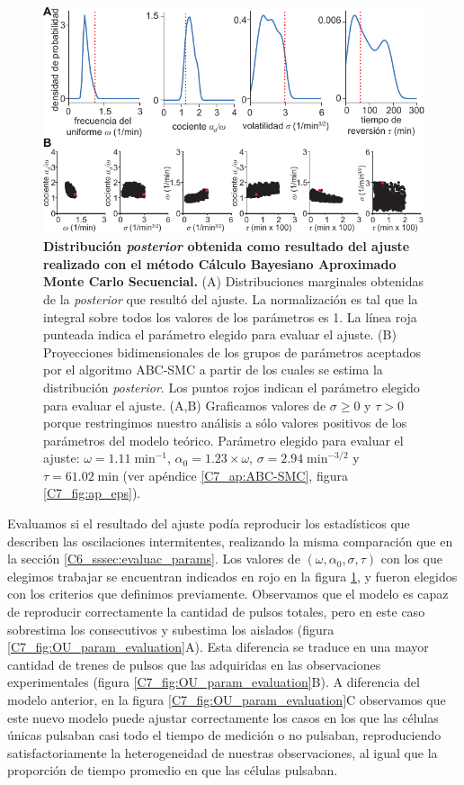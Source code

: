 \documentclass[./main.tex]{subfiles}
\begin{document}
\begin{figure}
    \centering
    \includegraphics[width=1\columnwidth]{figures/chapter7/C7_OU_fit.pdf} 
    \caption{\textbf{Distribución \textit{posterior} obtenida como resultado del ajuste realizado con el método Cálculo Bayesiano Aproximado Monte Carlo Secuencial.} (A) Distribuciones marginales obtenidas de la \textit{posterior} que resultó del ajuste. La normalización es tal que la integral sobre todos los valores de los parámetros es 1. La línea roja punteada indica el parámetro elegido para evaluar el ajuste. (B) Proyecciones bidimensionales de los grupos de parámetros aceptados por el algoritmo ABC-SMC a partir de los cuales se estima la distribución \textit{posterior}. Los puntos rojos indican el parámetro elegido para evaluar el ajuste. (A,B) Graficamos valores de $\sigma \geq 0$ y $\tau > 0$ porque restringimos nuestro análisis a sólo valores positivos de los parámetros del modelo teórico. Parámetro elegido para evaluar el ajuste: $\omega = 1.11\; \text{min}^{-1}$, $\alpha_0 = 1.23 \times \omega$, $ \sigma = 2.94 \;  \text{min}^{-3/2}$ y $\tau = 61.02 \; \text{min} $ (ver apéndice \ref{C7_ap:ABC-SMC}, figura \ref{C7_fig:ap_eps}).}
    \label{C7_fig:OU_fit}
\end{figure} 


Evaluamos si el resultado del ajuste podía reproducir los estadísticos que describen las oscilaciones intermitentes, realizando la misma comparación que en la sección \ref{C6_sssec:evaluac_params}. Los valores de $(\omega,\alpha_0,\sigma,\tau)$ con los que elegimos trabajar se encuentran indicados en rojo en la figura \ref{C7_fig:OU_fit}, y fueron elegidos con los criterios que definimos previamente. Observamos que el modelo es capaz de reproducir correctamente la cantidad de pulsos totales, pero en este caso sobrestima los consecutivos y subestima los aislados (figura \ref{C7_fig:OU_param_evaluation}A). Esta diferencia se traduce en una mayor cantidad de trenes de pulsos que las adquiridas en las observaciones experimentales (figura \ref{C7_fig:OU_param_evaluation}B). A diferencia del modelo anterior, en la figura \ref{C7_fig:OU_param_evaluation}C observamos que este nuevo modelo puede ajustar correctamente los casos en los que las células únicas pulsaban casi todo el tiempo de medición o no pulsaban, reproduciendo satisfactoriamente la heterogeneidad de nuestras observaciones, al igual que la proporción de tiempo promedio en que las células pulsaban.
\end{document}
